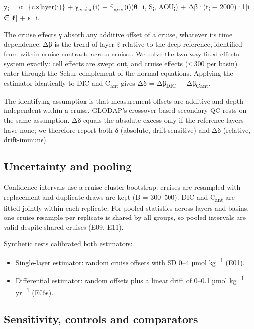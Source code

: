 \documentclass[11pt]{article}
\providecommand{\tightlist}{\setlength{\itemsep}{0pt}\setlength{\parskip}{0pt}}
\begin{document}
y\textsubscript{i} = α\_\{c×layer(i)\} + γ\textsubscript{cruise}(i) +
f\textsubscript{layer}(i)(θ\_i, S\textsubscript{i},
AOU\textsubscript{i}) + Δβ·(t\textsubscript{i} − 2000)·1{[}i ∈ ℓ{]} +
ε\_i.

The cruise effects γ absorb any additive offset of a cruise, whatever
its time dependence. Δβ is the trend of layer ℓ relative to the deep
reference, identified from within-cruise contrasts across cruises. We
solve the two-way fixed-effects system exactly: cell effects are swept
out, and cruise effects (≤ 300 per basin) enter through the Schur
complement of the normal equations. Applying the estimator identically
to DIC and C\textsubscript{ant} gives Δδ = Δβ\textsubscript{DIC} −
Δβ\textsubscript{Cant}.

The identifying assumption is that measurement offsets are additive and
depth-independent within a cruise. GLODAP's crossover-based secondary QC
rests on the same assumption. Δδ equals the absolute excess only if the
reference layers have none; we therefore report both δ (absolute,
drift-sensitive) and Δδ (relative, drift-immune).

\subsection{Uncertainty and pooling}\label{uncertainty-and-pooling}

Confidence intervals use a cruise-cluster bootstrap: cruises are
resampled with replacement and duplicate draws are kept (B = 300--500).
DIC and C\textsubscript{ant} are fitted jointly within each replicate.
For pooled statistics across layers and basins, one cruise resample per
replicate is shared by all groups, so pooled intervals are valid despite
shared cruises (E09, E11).

Synthetic tests calibrated both estimators:

\begin{itemize}
\tightlist
\item
  Single-layer estimator: random cruise offsets with SD 0--4 µmol
  kg\textsuperscript{−1} (E01).
\item
  Differential estimator: random offsets plus a linear drift of 0--0.1
  µmol kg\textsuperscript{−1} yr\textsuperscript{−1} (E06s).
\end{itemize}

\subsection{Sensitivity, controls and
comparators}\label{sensitivity-controls-and-comparators}
\end{document}
